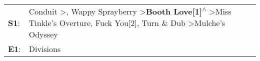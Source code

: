 \begin{supertabular}{p{0.03\textwidth}p{0.92\textwidth}}
 \textbf{S1}:  &  Conduit\textsuperscript{} \textgreater {}\textsuperscript{}, \enspace Wappy Sprayberry\textsuperscript{} \textgreater \enspace \textbf{Booth Love[1]\textsuperscript{$\wedge$}} \textgreater \enspace Miss Tinkle's Overture\textsuperscript{}, \enspace Fuck You[2]\textsuperscript{}, \enspace Turn \& Dub\textsuperscript{} \textgreater \enspace Mulche's Odyssey\textsuperscript{}  \enspace  \\
 \textbf{E1}:  &                                                                                                                                                                                                                                                                                                                                                                         Divisions\textsuperscript{}  \enspace  \\
\end{supertabular}
